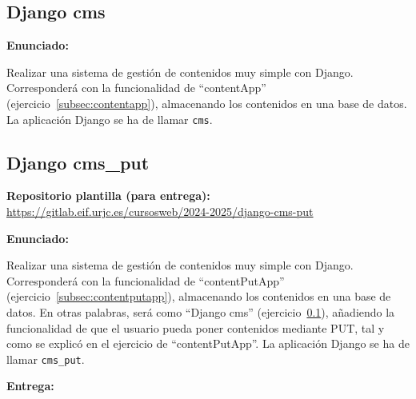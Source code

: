 \subsection{Django cms}
\label{subsec:django-cms}

\textbf{Enunciado:}

Realizar una sistema de gestión de contenidos muy simple con Django. Corresponderá con la funcionalidad de ``contentApp'' (ejercicio~\ref{subsec:contentapp}), almacenando los contenidos en una base de datos. La aplicación Django se ha de llamar \texttt{cms}.


%


\subsection{Django cms\_put}
\label{subsec:django-cms-put}

\textbf{Repositorio plantilla (para entrega):} \\
\url{https://gitlab.eif.urjc.es/cursosweb/2024-2025/django-cms-put}

\textbf{Enunciado:}

Realizar una sistema de gestión de contenidos muy simple con Django. Corresponderá con la funcionalidad de ``contentPutApp'' (ejercicio~\ref{subsec:contentputapp}), almacenando los contenidos en una base de datos. En otras palabras, será como ``Django cms'' (ejercicio~\ref{subsec:django-cms}), añadiendo la funcionalidad de que el usuario pueda poner contenidos mediante PUT, tal y como se explicó en el ejercicio de ``contentPutApp''. La aplicación Django se ha de llamar \texttt{cms\_put}.

\textbf{Entrega:}

